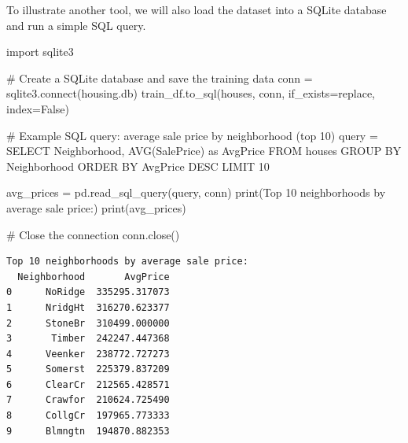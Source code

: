 \documentclass[
]{article}
\newenvironment{Shaded}{\begin{snugshade}}{\end{snugshade}}
\newcommand{\BuiltInTok}[1]{\textcolor[rgb]{0.00,0.23,0.31}{#1}}
\newcommand{\CommentTok}[1]{\textcolor[rgb]{0.37,0.37,0.37}{#1}}
\newcommand{\ExtensionTok}[1]{\textcolor[rgb]{0.00,0.23,0.31}{#1}}
\newcommand{\ImportTok}[1]{\textcolor[rgb]{0.00,0.46,0.62}{#1}}
\newcommand{\NormalTok}[1]{\textcolor[rgb]{0.00,0.23,0.31}{#1}}
\newcommand{\OperatorTok}[1]{\textcolor[rgb]{0.37,0.37,0.37}{#1}}
\newcommand{\StringTok}[1]{\textcolor[rgb]{0.13,0.47,0.30}{#1}}
\newcommand{\VariableTok}[1]{\textcolor[rgb]{0.07,0.07,0.07}{#1}}
\begin{document}
To illustrate another tool, we will also load the dataset into a SQLite
database and run a simple SQL query.

\begin{Shaded}
\begin{Highlighting}[]
\ImportTok{import}\NormalTok{ sqlite3}

\CommentTok{\# Create a SQLite database and save the training data}
\NormalTok{conn }\OperatorTok{=}\NormalTok{ sqlite3.}\ExtensionTok{connect}\NormalTok{(}\StringTok{\textquotesingle{}housing.db\textquotesingle{}}\NormalTok{)}
\NormalTok{train\_df.to\_sql(}\StringTok{\textquotesingle{}houses\textquotesingle{}}\NormalTok{, conn, if\_exists}\OperatorTok{=}\StringTok{\textquotesingle{}replace\textquotesingle{}}\NormalTok{, index}\OperatorTok{=}\VariableTok{False}\NormalTok{)}

\CommentTok{\# Example SQL query: average sale price by neighborhood (top 10)}
\NormalTok{query }\OperatorTok{=} \StringTok{\textquotesingle{}\textquotesingle{}\textquotesingle{}}
\StringTok{SELECT Neighborhood, AVG(SalePrice) as AvgPrice}
\StringTok{FROM houses}
\StringTok{GROUP BY Neighborhood}
\StringTok{ORDER BY AvgPrice DESC}
\StringTok{LIMIT 10}
\StringTok{\textquotesingle{}\textquotesingle{}\textquotesingle{}}

\NormalTok{avg\_prices }\OperatorTok{=}\NormalTok{ pd.read\_sql\_query(query, conn)}
\BuiltInTok{print}\NormalTok{(}\StringTok{\textquotesingle{}Top 10 neighborhoods by average sale price:\textquotesingle{}}\NormalTok{)}
\BuiltInTok{print}\NormalTok{(avg\_prices)}

\CommentTok{\# Close the connection}
\NormalTok{conn.close()}
\end{Highlighting}
\end{Shaded}

\begin{verbatim}
Top 10 neighborhoods by average sale price:
  Neighborhood       AvgPrice
0      NoRidge  335295.317073
1      NridgHt  316270.623377
2      StoneBr  310499.000000
3       Timber  242247.447368
4      Veenker  238772.727273
5      Somerst  225379.837209
6      ClearCr  212565.428571
7      Crawfor  210624.725490
8      CollgCr  197965.773333
9      Blmngtn  194870.882353
\end{verbatim}
\end{document}
